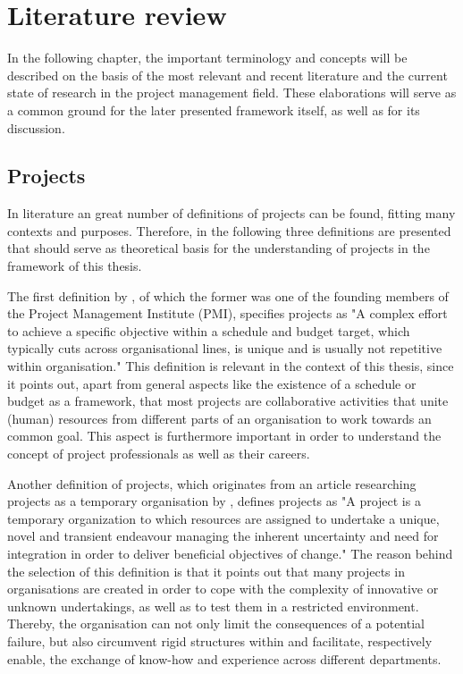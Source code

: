 \cleardoublepage

\section{Literature review}
\label{sec:LiteratureRev}

In the following chapter, the important terminology and concepts will be described on the basis of the most relevant and recent literature and the current state of research in the project management field. These elaborations will serve as a common ground for the later presented framework itself, as well as for its discussion. 

\subsection{Projects}
In literature an great number of definitions of projects can be found, fitting many contexts and purposes. Therefore, in the following three definitions are presented that should serve as theoretical basis for the understanding of projects in the framework of this thesis.

The first definition by , of which the former was one of the founding members of the Project Management Institute (PMI), specifies projects as "A complex effort to achieve a specific objective within a schedule and budget target, which typically cuts across organisational lines, is unique and  is usually not repetitive within organisation." This definition is relevant in the context of this thesis, since it points out, apart from general aspects like the existence of a schedule or budget as a framework, that most projects are collaborative activities that unite (human) resources from different parts of an organisation to work towards an common goal. This aspect is furthermore important in order to understand the concept of project professionals as well as their careers.

Another definition of projects, which originates from an article researching projects as a temporary organisation  by , defines projects as "A project is a temporary organization to which resources are assigned to undertake a unique, novel and transient endeavour managing the inherent uncertainty and need for integration in order to deliver beneficial objectives of change." The reason behind the selection of this definition is that it points out that many projects in organisations are created in order to cope with the complexity of innovative or unknown undertakings, as well as to test them in a restricted environment. Thereby, the organisation can not only limit the consequences of a potential failure, but also circumvent rigid structures within and facilitate, respectively enable, the exchange of know-how and experience across different departments.

